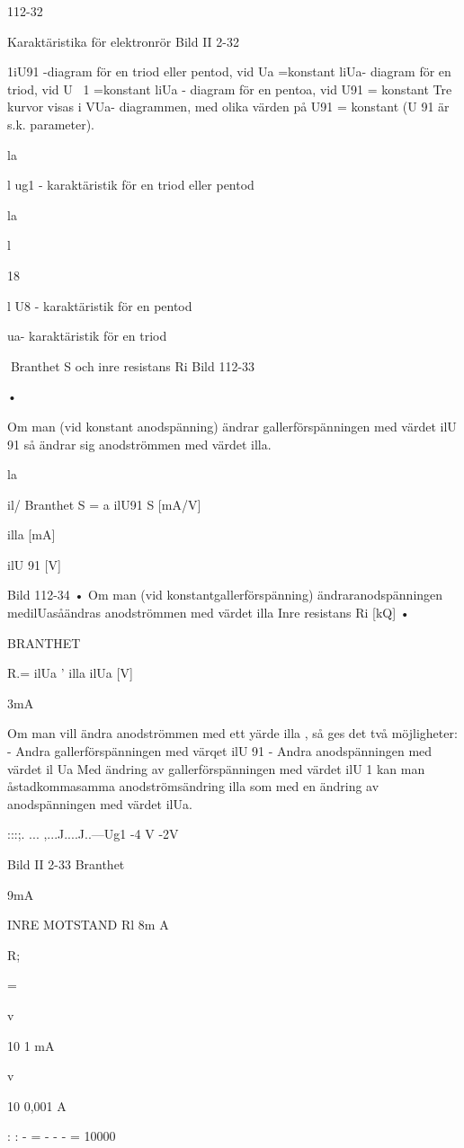 {{112-32

Karaktäristika för elektronrör
Bild II 2-32

1iU91 -diagram för en triod eller pentod, vid Ua
=konstant
liUa- diagram för en triod, vid U~ 1 =konstant
liUa - diagram för en pentoa, vid U91 =
konstant
Tre kurvor visas i VUa- diagrammen, med
olika värden på U91 = konstant (U 91 är s.k.
parameter).

la

l ug1 - karaktäristik för en triod eller pentod

la

l

18

l U8 - karaktäristik för en pentod

ua- karaktäristik för en triod

Branthet S och inre resistans Ri
Bild 112-33

•

Om man (vid konstant anodspänning)
ändrar gallerförspänningen med värdet
ilU 91 så ändrar sig anodströmmen med
värdet illa.

la

il/
Branthet S = a
ilU91
S [mA/V]

illa [mA]

ilU 91 [V]

Bild 112-34
• Om man (vid konstantgallerförspänning)
ändraranodspänningen medilUasåändras anodströmmen med värdet illa
Inre resistans
Ri [kQ]
•

BRANTHET

R.= ilUa
' illa
ilUa [V]

3mA

Om man vill ändra anodströmmen med
ett yärde illa , så ges det två möjligheter:
- Andra gallerförspänningen med värqet ilU 91
- Andra anodspänningen med värdet
il Ua
Med ändring av gallerförspänningen
med värdet ilU 1 kan man åstadkommasamma anodströmsändring illa som
med en ändring av anodspänningen
med värdet ilUa.

:::;. ... ,...J....J..---Ug1
-4 V
-2V

Bild II 2-33 Branthet

9mA

INRE MOTSTAND Rl
8m A

R;

=

v

10
1 mA

v

10
0,001 A

: : - = - - - = 10000

}}
